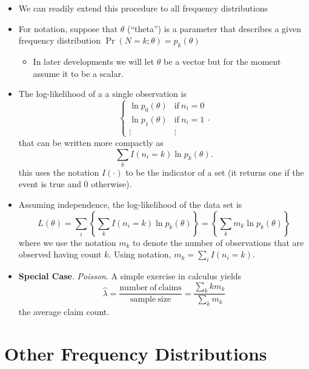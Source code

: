 \documentclass[]{book}
\providecommand{\tightlist}{%
  \setlength{\itemsep}{0pt}\setlength{\parskip}{0pt}}
\begin{document}
\begin{itemize}
\item
  We can readily extend this procedure to all frequency distributions
\item
  For notation, suppose that \(\theta\) (``theta'') is a parameter that
  describes a given frequency distribution
  \(\Pr(N=k; \theta) = p_k(\theta)\)

  \begin{itemize}
  \tightlist
  \item
    In later developments we will let \(\theta\) be a vector but for the
    moment assume it to be a scalar.
  \end{itemize}
\item
  The log-likelihood of a a single observation is \[\left\{
  \begin{array}{ll}
  \ln p_0(\theta) & \mathrm{if}\ n_i=0 \\
  \ln p_1(\theta) & \mathrm{if}\ n_i=1 \\
  \vdots & \vdots
  \end{array}
  \right. .\] that can be written more compactly as
  \[\sum_k I(n_i=k) \ln p_k(\theta).\] this uses the notation
  \(I(\cdot)\) to be the indicator of a set (it returns one if the event
  is true and 0 otherwise).
\item
  Assuming independence, the log-likelihood of the data set is
  \[L(\theta)=\sum_i \left\{ \sum_k I(n_i=k) \ln p_k(\theta) \right\} = \left\{ \sum_k m_k\ln p_k(\theta) \right\}\]
  where we use the notation \(m_k\) to denote the number of observations
  that are observed having count \(k\). Using notation,
  \(m_k = \sum_i I(n_i=k)\).
\item
  \textbf{Special Case}. \emph{Poisson}. A simple exercise in calculus
  yields
  \[\hat{\lambda} =  \frac{\mathrm{number ~of ~claims}}{\mathrm{sample ~size}} = \frac{\sum_k k m_k}{\sum_k  m_k}\]
  the average claim count.
\end{itemize}

\section{Other Frequency
Distributions}\label{other-frequency-distributions}
\end{document}
